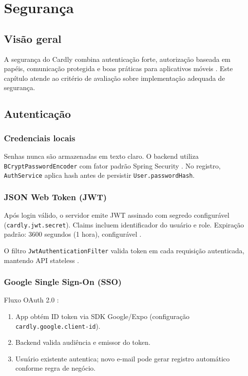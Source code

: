 \chapter{Segurança}
\label{cap:seguranca}

\section{Visão geral}

A segurança do Cardly combina autenticação forte, autorização baseada em papéis, comunicação protegida e boas práticas para aplicativos móveis \cite{owasp_mobile,spring_security_jwt,jwt_io}. Este capítulo atende ao critério de avaliação sobre implementação adequada de segurança.

\section{Autenticação}

\subsection{Credenciais locais}

Senhas nunca são armazenadas em texto claro. O backend utiliza \texttt{BCryptPasswordEncoder} com fator padrão Spring Security \cite{bcrypt_spring}. No registro, \texttt{AuthService} aplica hash antes de persistir \texttt{User.passwordHash}.

\subsection{JSON Web Token (JWT)}

Após login válido, o servidor emite JWT assinado com segredo configurável (\texttt{cardly.jwt.secret}). Claims incluem identificador do usuário e role. Expiração padrão: 3600 segundos (1 hora), configurável \cite{jwt_io,youtube_jwt_explained}.

O filtro \texttt{JwtAuthenticationFilter} valida token em cada requisição autenticada, mantendo API stateless \cite{spring_security_jwt,stackoverflow_jwt_spring}.

\subsection{Google Single Sign-On (SSO)}

Fluxo OAuth 2.0 \cite{google_oauth}:
\begin{enumerate}
    \item App obtém ID token via SDK Google/Expo (configuração \texttt{cardly.google.client-id}).
    \item Backend valida audiência e emissor do token.
    \item Usuário existente autentica; novo e-mail pode gerar registro automático conforme regra de negócio.
\end{enumerate}

